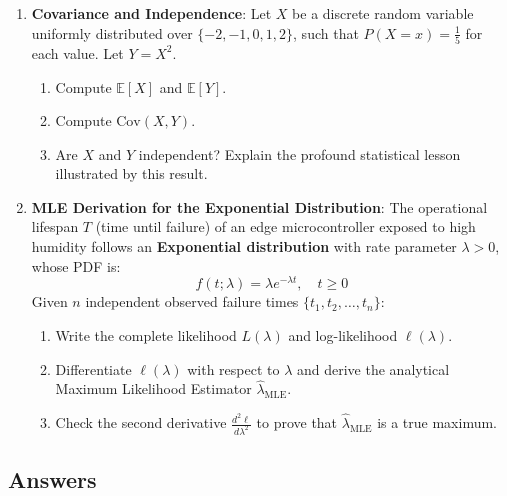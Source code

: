 \begin{checkyourself}
\begin{enumerate}
    \item \textbf{Covariance and Independence}:
    Let $X$ be a discrete random variable uniformly distributed over $\{-2, -1, 0, 1, 2\}$, such that $P(X = x) = \frac{1}{5}$ for each value. Let $Y = X^2$.
    \begin{enumerate}[label=(\alph*)]
        \item Compute $\mathbb{E}[X]$ and $\mathbb{E}[Y]$.
        \item Compute $\text{Cov}(X, Y)$.
        \item Are $X$ and $Y$ independent? Explain the profound statistical lesson illustrated by this result.
    \end{enumerate}

    \item \textbf{MLE Derivation for the Exponential Distribution}:
    The operational lifespan $T$ (time until failure) of an edge microcontroller exposed to high humidity follows an \textbf{Exponential distribution} with rate parameter $\lambda > 0$, whose PDF is:
    \begin{equation*}
    f(t; \lambda) = \lambda e^{-\lambda t}, \quad t \ge 0
    \end{equation*}
    Given $n$ independent observed failure times $\{t_1, t_2, \dots, t_n\}$:
    \begin{enumerate}[label=(\alph*)]
        \item Write the complete likelihood $L(\lambda)$ and log-likelihood $\ell(\lambda)$.
        \item Differentiate $\ell(\lambda)$ with respect to $\lambda$ and derive the analytical Maximum Likelihood Estimator $\hat{\lambda}_{\text{MLE}}$.
        \item Check the second derivative $\frac{d^2\ell}{d\lambda^2}$ to prove that $\hat{\lambda}_{\text{MLE}}$ is a true maximum.
    \end{enumerate}
\end{enumerate}
\end{checkyourself}

\subsection*{Answers}

